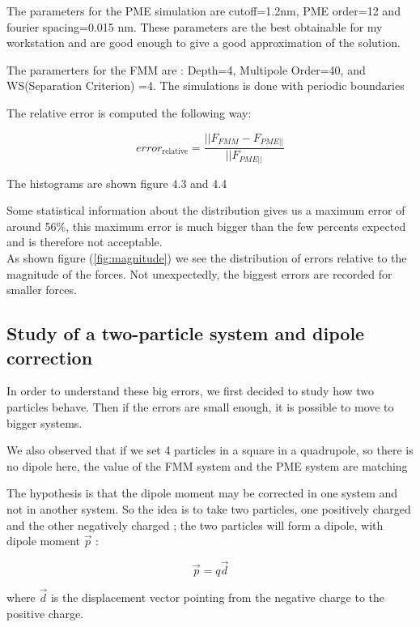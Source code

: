 \documentclass[11pt,twoside,a4paper]{report}
\begin{document}
The parameters for the PME simulation are cutoff=1.2nm, PME order=12 and fourier spacing=0.015 nm. These parameters are the best obtainable for my workstation and are good enough to give a good approximation of the solution.

The paramerters for the FMM are : Depth=4, Multipole Order=40, and WS(Separation Criterion) =4. The simulations is done with periodic boundaries 

The relative error is computed the following way:

\begin{equation}
	error_{\text{relative}} = \frac{||F_{FMM} - F_{PME||}}{||F_{PME||}}
\end{equation}

The histograms are shown figure 4.3 and 4.4


	Some statistical information about the distribution gives us a maximum error of around 56\%, this maximum error is much bigger than the few percents expected and is therefore not acceptable.\\
	
	As shown figure (\ref{fig:magnitude}) we see the distribution of errors relative to the magnitude of the forces. Not unexpectedly, the biggest errors are recorded for smaller forces.

\subsection{Study of a two-particle system and dipole correction}
	In order to understand these big errors, we first decided to study how two particles behave. Then if the errors are small enough, it is possible to move to bigger systems.
	
We also observed that if we set 4 particles in a square in a quadrupole, so there is no dipole here, the value of the FMM system and the PME system are matching




 	
	
The hypothesis is that the dipole moment may be corrected in one system and not in another system. So the idea is to take two particles, one positively charged and the other negatively charged ; the two particles will form a dipole, with dipole moment $\vec{p}$ : 

\begin{equation}
	\vec{p} = q \vec{d}
\end{equation}	
	
	where $\vec{d}$ is the displacement vector pointing from the negative charge to the positive charge. 
	
\end{document}
